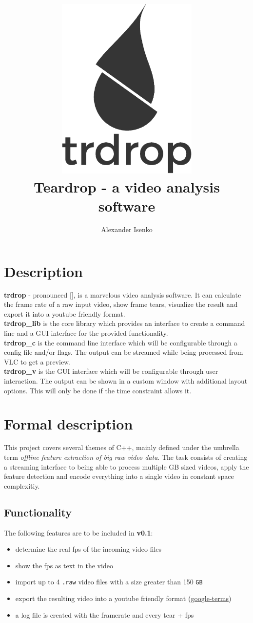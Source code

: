 \documentclass[titlepage]{article}
\title{\includegraphics[width=200pt, height=260pt]{../../images/trdrop_logo_text.eps} \\[50pt]
Teardrop - a video analysis software}
\author{Alexander Isenko}
\date{}
\begin{document}
\maketitle

\newpage

\section{Description}

\textbf{trdrop} - pronounced [\textit{}], is a marvelous video analysis software. It can calculate the frame rate of a raw input video, show frame tears, visualize the result and export it into a youtube friendly format. \\[2mm]
\hfill
\textbf{trdrop\_lib} is the core library which provides an interface to create a command line and a GUI interface for the provided functionality. \\[2mm]
\hfill
\textbf{trdrop\_c} is the command line interface which will be configurable through a config file and/or flags. The output can be streamed while being processed from VLC to get a preview. \\[2mm]
\hfill
\textbf{trdrop\_v} is the GUI interface which will be configurable through user interaction. The output can be shown in a custom window with additional layout options. This will only be done if the time constraint allows it.

\section{Formal description}

This project covers several themes of C++, mainly defined under the umbrella term \textit{offline feature extraction of big raw video data}. The task consists of creating a streaming interface to being able to process multiple GB sized videos, apply the feature detection and encode everything into a single video in constant space complexitiy.

\subsection{Functionality}

The following features are to be included in \textbf{v0.1}:

\begin{itemize}
    \item determine the real fps of the incoming video files
    \item show the fps as text in the video
    \item import up to 4 \texttt{.raw} video files with a size greater than 150 \texttt{GB}
    \item export the resulting video into a youtube friendly format (\href{https://support.google.com/youtube/answer/1722171}{google-terms})
    \item a log file is created with the framerate and every tear + fps
\end{itemize}
\end{document}
